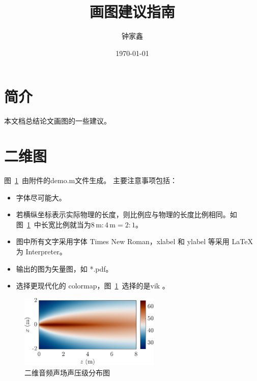 \documentclass{ctexart}
\title{\textbf{画图建议指南}}
\author{钟家鑫}
\date{\today}
\begin{document}
\maketitle

\section{简介}
本文档总结论文画图的一些建议。

\section{二维图}
图~\ref{fig:2d_fig}~由附件的demo.m文件生成。
主要注意事项包括：
\begin{itemize}
    \item 字体尽可能大。
    \item 若横纵坐标表示实际物理的长度，则比例应与物理的长度比例相同。如图~\ref{fig:2d_fig}~中长宽比例就当为$8\,\mathrm{m} : 4\, \mathrm{m} = 2:1$。
    \item 图中所有文字采用字体 Times New Roman，xlabel 和 ylabel 等采用 LaTeX 为 Interpreter。
    \item 输出的图为矢量图，如 *.pdf。
    \item 选择更现代化的 colormap，图~\ref{fig:2d_fig}~选择的是vik \cite{Crameri2020MisuseColourScience}。
\end{itemize}

\begin{figure}[!htb]
    \centering
    \includegraphics[width = 0.6\textwidth]{fig}
    \caption{二维音频声场声压级分布图}
    \label{fig:2d_fig}
\end{figure}





\end{document}
